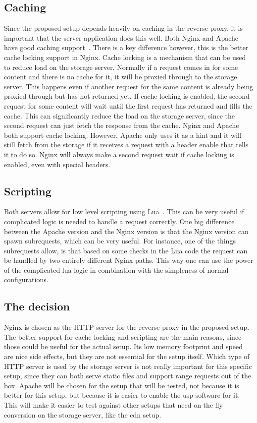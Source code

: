 \documentclass[twoside,openright]{uva-bachelor-thesis}
\begin{document}
\subsection{Caching}
Since the proposed setup depends heavily on caching in the reverse proxy, it is
important that the server application does this well. Both Nginx and Apache have
good caching support~\autocites{nginxcache}{apachecache}. There is a key
difference however, this is the better cache locking support in Nginx. Cache
locking is a mechanism that can be used to reduce load on the storage server.
Normally if a request comes in for some content and there is no cache for it,
it will be proxied through to the storage server. This happens even if another
request for the same content is already being proxied through but has not
returned yet. If cache locking is enabled, the second request for some content
will wait until the first request has returned and fills the cache. This can
significantly reduce the load on the storage server, since the second request
can just fetch the response from the cache. Nginx and Apache both support cache
locking. However, Apache only uses it as a hint and it will still fetch from the
storage if it receives a request with a header enable that tells it to do so.
Nginx will always make a second request wait if cache locking is enabled, even
with special headers.


\subsection{Scripting}
Both servers allow for low level scripting using
Lua~\autocites{nginxlua}{cloudflarelua}{apachelua}. This can be very useful if
complicated logic is needed to handle a request correctly. One big difference
between the Apache version and the Nginx version is that the Nginx version
can spawn subrequests, which can be very useful. For instance, one of the things
subrequests allow, is that based on some checks in the Lua code the request can
be handled by two entirely different Nginx paths. This way one can use the power
of the complicated lua logic in combination with the simpleness of normal
configurations.


\subsection{The decision}
Nginx is chosen as the HTTP server for the reverse proxy in the proposed setup.
The better support for cache locking and scripting are the main reasons, since
those could be useful for the actual setup. Its low memory footprint and speed
are nice side effects, but they are not essential for the setup itself.  Which
type of HTTP server is used by the storage server is not really important for
this specific setup, since they can both serve static files and support
range requests out of the box. Apache will be chosen for the setup that will be
tested, not because it is better for this setup, but because it is easier to
enable the \gls{usp} software for it. This will make it easier to test against
other setups that need on the fly conversion on the storage server, like the
\gls{cdn} setup.
\end{document}
